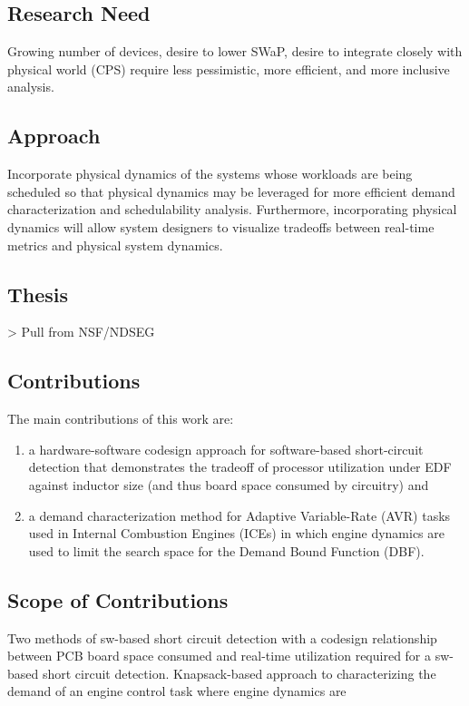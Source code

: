 \subsection{Research Need}
Growing number of devices, desire to lower SWaP, desire to integrate closely with physical world (CPS) require less pessimistic, more efficient, and more inclusive analysis.

\subsection{Approach}
Incorporate physical dynamics of the systems whose workloads are being scheduled so that physical dynamics may be leveraged for more efficient demand characterization and schedulability analysis.
Furthermore, incorporating physical dynamics will allow system designers to visualize tradeoffs between real-time metrics and physical system dynamics.

\subsection{Thesis}

> Pull from NSF/NDSEG

\subsection{Contributions}

The main contributions of this work are:
\begin{enumerate}
    \item a hardware-software codesign approach for software-based short-circuit detection that demonstrates the tradeoff of processor utilization under EDF against inductor size (and thus board space consumed by circuitry) and
    \item a demand characterization method for Adaptive Variable-Rate (AVR) tasks used in Internal Combustion Engines (ICEs) in which engine dynamics are used to limit the search space for the Demand Bound Function (DBF).
\end{enumerate}

\subsection{Scope of Contributions}

Two methods of sw-based short circuit detection with a codesign relationship between PCB board space consumed and real-time utilization required for a sw-based short circuit detection.
Knapsack-based approach to characterizing the demand of an engine control task where engine dynamics are 

